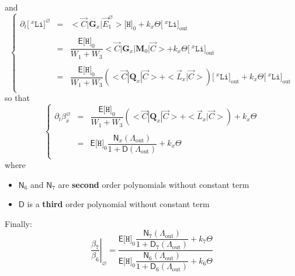 \documentclass[aps,onecolumn,11pt]{revtex4}
\newcommand{\mychem}[1]{\mathtt{#1}}
\newcommand{\myconc}[1]{\big[#1\big]}
\newcommand{\spLi}[1]{{\!~^{#1}\mychem{Li}}}
\newcommand{\Li}[1]{\myconc{\spLi{#1}}}
\newcommand{\spproton}{\mychem{H}}
\newcommand{\proton}{\myconc{\spproton}}
\newcommand{\myout}[1]{{#1}_{\mathrm{out}}}
\newcommand{\mymat}[1]{{\bm{#1}}}
\newcommand{\LiAll}{\Lambda}
\newcommand{\LiAllOut}{\myout{\LiAll}}
\begin{document}
and
\begin{equation}
\left\lbrace
\begin{array}{rcl}
	\partial_t \Li{x}^\varnothing & = & <\vec{C}|\mymat{G}_x|\vec{E}_1^\varnothing> \proton_0 + k_x \Theta \myout{\Li{x}}\\
	\\
	 & = & \dfrac{\mathsf{E}\proton_0}{W_1+W_3} <\vec{C}|\mymat{G}_x|\mymat{M}_0|\vec{C}> + k_x \Theta \myout{\Li{x}}\\
	 \\
	 & = & \dfrac{\mathsf{E}\proton_0}{W_1+W_3} \left( <\vec{C}|\mymat{Q}_x|\vec{C}> + <\vec{L}_x|\vec{C}>\right)\myout{\Li{x}} + k_x \Theta \myout{\Li{x}}  \\
\end{array}
\right.
\end{equation}
so that
\begin{equation}
\left\lbrace
\begin{array}{rcl}
\partial_t \beta_x^\varnothing & = & \dfrac{\mathsf{E}\proton_0}{W_1+W_3} \left( <\vec{C}|\mymat{Q}_x|\vec{C}> + <\vec{L}_x|\vec{C}>\right) + k_x \Theta \\
\\
& = & \mathsf{E}\proton_0 \dfrac{\mathsf{N}_x(\LiAllOut)}{1+\mathsf{D}(\LiAllOut)} + k_x \Theta \\
\end{array}
\right.
\end{equation}
where 
\begin{itemize}
\item ${\mathsf{N}_6}$ and  ${\mathsf{N}_7}$ are  {\bf second} order polynomials without constant term
\item ${\mathsf{D}}$ is a {\bf third } order polynomial without constant term
\end{itemize}
Finally:
\begin{equation}
\left.\dfrac{\beta_7}{\beta_6}\right\vert_{\varnothing} = 
\dfrac{
\mathsf{E}\proton_0 \dfrac{\mathsf{N}_7(\LiAllOut)}{1+\mathsf{D}_7(\LiAllOut)} + k_7 \Theta 
}
{
\mathsf{E}\proton_0 \dfrac{\mathsf{N}_6(\LiAllOut)}{1+\mathsf{D}_6(\LiAllOut)} + k_6 \Theta 
}
\end{equation}
\end{document}
